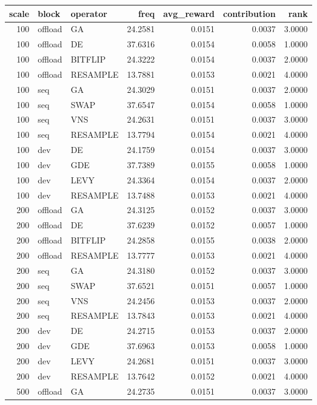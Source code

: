 \begin{tabular}{rllrrrr}
\toprule
scale & block & operator & freq & avg_reward & contribution & rank \\
\midrule
100 & offload & GA & 24.2581 & 0.0151 & 0.0037 & 3.0000 \\
100 & offload & DE & 37.6316 & 0.0154 & 0.0058 & 1.0000 \\
100 & offload & BITFLIP & 24.3222 & 0.0154 & 0.0037 & 2.0000 \\
100 & offload & RESAMPLE & 13.7881 & 0.0153 & 0.0021 & 4.0000 \\
100 & seq & GA & 24.3029 & 0.0151 & 0.0037 & 2.0000 \\
100 & seq & SWAP & 37.6547 & 0.0154 & 0.0058 & 1.0000 \\
100 & seq & VNS & 24.2631 & 0.0151 & 0.0037 & 3.0000 \\
100 & seq & RESAMPLE & 13.7794 & 0.0154 & 0.0021 & 4.0000 \\
100 & dev & DE & 24.1759 & 0.0154 & 0.0037 & 3.0000 \\
100 & dev & GDE & 37.7389 & 0.0155 & 0.0058 & 1.0000 \\
100 & dev & LEVY & 24.3364 & 0.0154 & 0.0037 & 2.0000 \\
100 & dev & RESAMPLE & 13.7488 & 0.0153 & 0.0021 & 4.0000 \\
200 & offload & GA & 24.3125 & 0.0152 & 0.0037 & 3.0000 \\
200 & offload & DE & 37.6239 & 0.0152 & 0.0057 & 1.0000 \\
200 & offload & BITFLIP & 24.2858 & 0.0155 & 0.0038 & 2.0000 \\
200 & offload & RESAMPLE & 13.7777 & 0.0153 & 0.0021 & 4.0000 \\
200 & seq & GA & 24.3180 & 0.0152 & 0.0037 & 3.0000 \\
200 & seq & SWAP & 37.6521 & 0.0151 & 0.0057 & 1.0000 \\
200 & seq & VNS & 24.2456 & 0.0153 & 0.0037 & 2.0000 \\
200 & seq & RESAMPLE & 13.7843 & 0.0153 & 0.0021 & 4.0000 \\
200 & dev & DE & 24.2715 & 0.0153 & 0.0037 & 2.0000 \\
200 & dev & GDE & 37.6963 & 0.0153 & 0.0058 & 1.0000 \\
200 & dev & LEVY & 24.2681 & 0.0151 & 0.0037 & 3.0000 \\
200 & dev & RESAMPLE & 13.7642 & 0.0152 & 0.0021 & 4.0000 \\
500 & offload & GA & 24.2735 & 0.0151 & 0.0037 & 3.0000 \\

\end{tabular}
